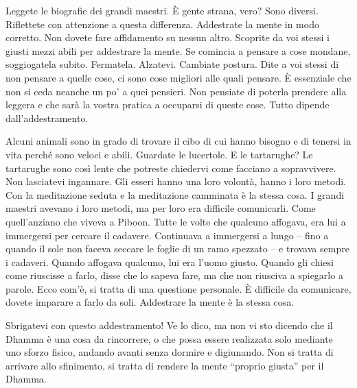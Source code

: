 Leggete le biografie dei grandi maestri. È gente strana, vero? Sono
diversi. Riflettete con attenzione a questa differenza. Addestrate la
mente in modo corretto. Non dovete fare affidamento su nessun altro.
Scoprite da voi stessi i giusti mezzi abili per addestrare la mente. Se
comincia a pensare a cose mondane, soggiogatela subito. Fermatela.
Alzatevi. Cambiate postura. Dite a voi stessi di non pensare a quelle
cose, ci sono cose migliori alle quali pensare. È essenziale che non si
ceda neanche un po' a quei pensieri. Non pensiate di poterla prendere
alla leggera e che sarà la vostra pratica a occuparsi di queste cose.
Tutto dipende dall'addestramento.

Alcuni animali sono in grado di trovare il cibo di cui hanno bisogno e
di tenersi in vita perché sono veloci e abili. Guardate le lucertole. E
le tartarughe? Le tartarughe sono così lente che potreste chiedervi come
facciano a sopravvivere. Non lasciatevi ingannare. Gli esseri hanno una
loro volontà, hanno i loro metodi. Con la meditazione seduta e la
meditazione camminata è la stessa cosa. I grandi maestri avevano i loro
metodi, ma per loro era difficile comunicarli. Come quell'anziano che
viveva a Piboon. Tutte le volte che qualcuno affogava, era lui a
immergersi per cercare il cadavere. Continuava a immergersi a lungo --
fino a quando il sole non faceva seccare le foglie di un ramo spezzato
-- e trovava sempre i cadaveri. Quando affogava qualcuno, lui era l'uomo
giusto. Quando gli chiesi come riuscisse a farlo, disse che lo sapeva
fare, ma che non riusciva a spiegarlo a parole. Ecco com'è, si tratta di
una questione personale. È difficile da comunicare, dovete imparare a
farlo da soli. Addestrare la mente è la stessa cosa.

Sbrigatevi con questo addestramento! Ve lo dico, ma non vi sto dicendo
che il Dhamma è una cosa da rincorrere, o che possa essere realizzata
solo mediante uno sforzo fisico, andando avanti senza dormire e
digiunando. Non si tratta di arrivare allo sfinimento, si tratta di
rendere la mente ``proprio giusta'' per il Dhamma.

